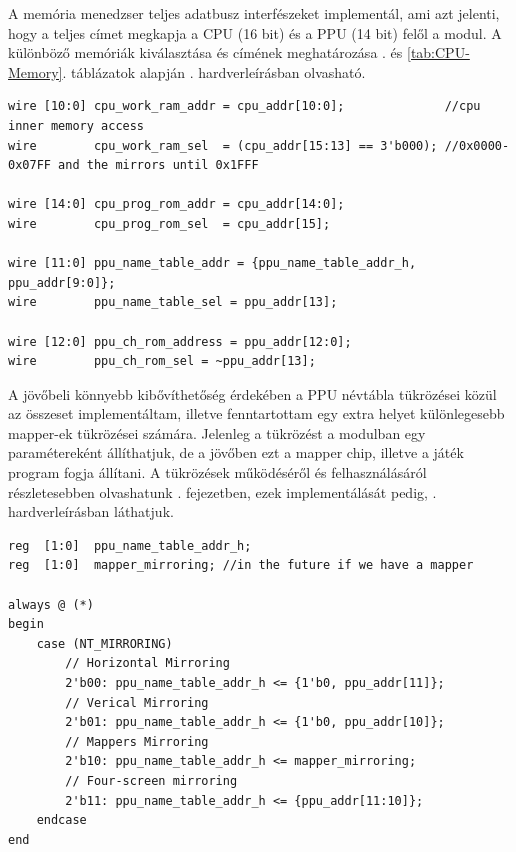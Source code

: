 A memória menedzser teljes adatbusz interfészeket implementál, ami azt jelenti, hogy a teljes címet megkapja a CPU (16 bit) és a PPU (14 bit) felől a modul. A különböző memóriák kiválasztása és címének meghatározása . és \ref{tab:CPU-Memory}. táblázatok alapján . hardverleírásban olvasható.

\begin{lstlisting}[caption={A memória menedzserben található memória területek címzése}, label={code:memory-addresing}, style=prettyverilog]
wire [10:0]	cpu_work_ram_addr = cpu_addr[10:0];			 	 //cpu inner memory access
wire		cpu_work_ram_sel  = (cpu_addr[15:13] == 3'b000); //0x0000-0x07FF and the mirrors until 0x1FFF

wire [14:0]	cpu_prog_rom_addr = cpu_addr[14:0];			 
wire		cpu_prog_rom_sel  = cpu_addr[15]; 

wire [11:0]	ppu_name_table_addr = {ppu_name_table_addr_h, ppu_addr[9:0]};
wire		ppu_name_table_sel = ppu_addr[13];

wire [12:0] ppu_ch_rom_address = ppu_addr[12:0];
wire		ppu_ch_rom_sel = ~ppu_addr[13];\end{lstlisting}

A jövőbeli könnyebb kibővíthetőség érdekében a PPU névtábla tükrözései közül az összeset implementáltam, illetve fenntartottam egy extra helyet különlegesebb mapper-ek tükrözései számára. Jelenleg a tükrözést a modulban egy paramétereként állíthatjuk, de a jövőben ezt a mapper chip, illetve a játék program fogja állítani. A tükrözések működéséről és felhasználásáról részletesebben olvashatunk . fejezetben, ezek implementálását pedig, . hardverleírásban láthatjuk. 

\begin{lstlisting}[caption={A PPU görgetéshez használt névtábla tükrözés}, label={code:nt-address-mirroring}, style=prettyverilog]
reg  [1:0] 	ppu_name_table_addr_h;
reg	 [1:0]	mapper_mirroring; //in the future if we have a mapper

always @ (*)
begin
	case (NT_MIRRORING)
		// Horizontal Mirroring
		2'b00: ppu_name_table_addr_h <= {1'b0, ppu_addr[11]};
		// Verical Mirroring
		2'b01: ppu_name_table_addr_h <= {1'b0, ppu_addr[10]};
		// Mappers Mirroring
		2'b10: ppu_name_table_addr_h <= mapper_mirroring;
		// Four-screen mirroring 
		2'b11: ppu_name_table_addr_h <= {ppu_addr[11:10]};
	endcase
end\end{lstlisting}

